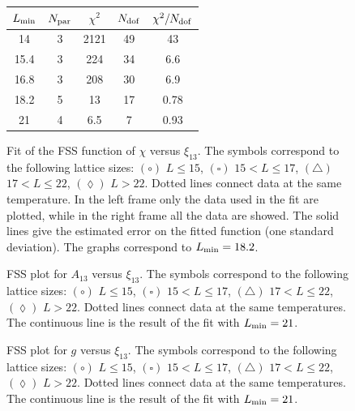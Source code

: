 \documentclass[12pt]{article}
\newcommand{\text}{\rm}
\begin{document}
\begin{figure}
\begin{center}
{\scriptsize
\begin{tabular}{|c|c|c|c|c|}
\hline
$L_{\text{min}}$ & $N_{\text{par}}$ & $\chi^2$ & $N_{\text{dof}}$ &
$\chi^2/N_{\text{dof}}$ \\
\hline
 14 &        3   &     2121 &  49 &     43\\
 15.4 &        3   &     224 &  34 &     6.6\\
 16.8 &        3   &     208 &  30 &     6.9\\
 18.2 &        5   &     13 &  17 &     0.78\\
 21 &        4   &     6.5 &  7  &     0.93\\
\hline
\end{tabular}
}
\end{center}
\caption{ Fit of the FSS function of $\chi$ versus $\xi_{13}$.
The symbols correspond to the
following lattice sizes: $(\circ)$ $ L\le 15$, $( \square )$ $ 15 < L \le 17$,
$(\triangle)$ $ 17 < L \le 22$, $(\lozenge)$ $ L > 22$.
Dotted lines connect data at the same temperature.
In the left frame only the data used in the fit are plotted,
while in the right frame all the data are showed.
The solid lines give the estimated error on
the fitted function (one standard deviation).
The graphs correspond to  
$L_{\text{min}}=18.2$.}
\label{fig:fitfss_s1_xi13}
\end{figure}                                                                    

\begin{figure}
\caption{FSS plot for $A_{13}$ versus $\xi_{13}$. 
The symbols correspond to the
following lattice sizes: $(\circ)$ $ L\le 15$, $( \square )$ $ 15 < L \le 17$,
$(\triangle)$ $ 17 < L \le 22$, $(\lozenge)$ $ L > 22$.
Dotted lines connect data at the same temperatures. 
The continuous line is the result of the fit with $L_{\rm min} = 21$.
}
\label{fig:fssplot_a13_xi13}
\end{figure}

\begin{figure}
\vspace*{-2truecm} 
\begin{center}
\end{center}
\vspace*{-1.5truecm} 
\caption{FSS plot for $g$ versus $\xi_{13}$. 
The symbols correspond to the
following lattice sizes: $(\circ)$ $ L\le 15$, $( \square )$ $ 15 < L \le 17$,
$(\triangle)$ $ 17 < L \le 22$, $(\lozenge)$ $ L > 22$.
Dotted lines connect data at the same temperatures.
The continuous line is the result of the fit with $L_{\rm min} = 21$.
}
\label{fig:fssplot_g_xi13}
\end{figure}
 
\end{document}
